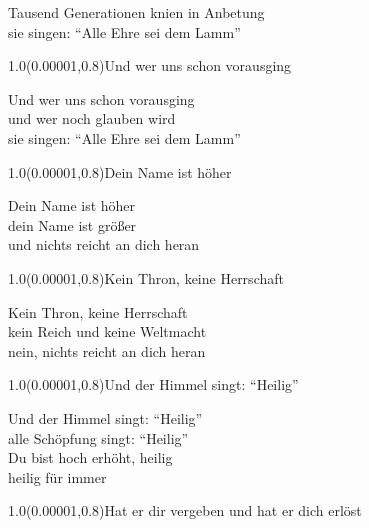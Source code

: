 \documentclass[aspectratio=169]{beamer}
\begin{document}
\color{white}
\begin{frame}
\centering
\color{white}
\huge{Tausend Generationen knien in Anbetung} \\
\huge{sie singen: “Alle Ehre sei dem Lamm”} \\

\begin{textblock}{1.0}(0.00001,0.8)\color{gray}\normalsize{Und wer uns schon vorausging}\end{textblock}
\end{frame}

\begin{frame}
\centering
\color{white}
\huge{Und wer uns schon vorausging} \\
\huge{und wer noch glauben wird} \\
\huge{sie singen: “Alle Ehre sei dem Lamm”} \\

\begin{textblock}{1.0}(0.00001,0.8)\color{gray}\normalsize{Dein Name ist höher}\end{textblock}
\end{frame}

\begin{frame}
\centering
\color{white}
\huge{Dein Name ist höher} \\
\huge{dein Name ist größer} \\
\huge{und nichts reicht an dich heran} \\

\begin{textblock}{1.0}(0.00001,0.8)\color{gray}\normalsize{Kein Thron, keine Herrschaft}\end{textblock}
\end{frame}

\begin{frame}
\centering
\color{white}
\huge{Kein Thron, keine Herrschaft} \\
\huge{kein Reich und keine Weltmacht} \\
\huge{nein, nichts reicht an dich heran} \\

\begin{textblock}{1.0}(0.00001,0.8)\color{gray}\normalsize{Und der Himmel singt: “Heilig”}\end{textblock}
\end{frame}

\begin{frame}
\centering
\color{white}
\huge{Und der Himmel singt: “Heilig”} \\
\huge{alle Schöpfung singt: “Heilig”} \\
\huge{Du bist hoch erhöht, heilig} \\
\huge{heilig für immer} \\

\begin{textblock}{1.0}(0.00001,0.8)\color{gray}\normalsize{Hat er dir vergeben und hat er dich erlöst}\end{textblock}
\end{frame}
\end{document}
